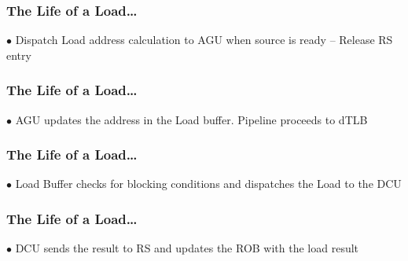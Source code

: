 \documentclass[aspectratio=169,12pt]{beamer}
\begin{document}
\begin{frame}
\frametitle{The Life of a Load\ldots}
\begin{center}
\LoadLifecycleDiagram[
    rat3={RF0},
    robNum={Ld},
    robValid={1},
    robRdy={0},
    robData={X},
    iq1={R3$\leftarrow$MEM(R2+50)},
    lbV={1},
    lbAddr={Not Valid},
    lbBC={0},
    agu={R2+50},
    arrows=2
]
\end{center}
\vspace{-3mm}
\scriptsize
$\bullet$ Dispatch Load address calculation to AGU when source is ready -- Release RS entry
\end{frame}

\begin{frame}
\frametitle{The Life of a Load\ldots}
\begin{center}
\LoadLifecycleDiagram[
    rat3={RF0},
    robNum={Ld},
    robValid={1},
    robRdy={0},
    robData={X},
    iq1={R3$\leftarrow$MEM(R2+50)},
    lbV={1},
    lbAddr={V(R2+50)},
    lbBC={0},
    arrows=3
]
\end{center}
\vspace{-3mm}
\scriptsize
$\bullet$ AGU updates the address in the Load buffer. Pipeline proceeds to dTLB
\end{frame}

\begin{frame}
\frametitle{The Life of a Load\ldots}
\begin{center}
\LoadLifecycleDiagram[
    rat3={RF0},
    robNum={Ld},
    robValid={1},
    robRdy={0},
    robData={X},
    iq1={R3$\leftarrow$MEM(R2+50)},
    lbV={1},
    lbAddr={V(R2+50)},
    lbBC={0},
    arrows=4
]
\end{center}
\vspace{-3mm}
\scriptsize
$\bullet$ Load Buffer checks for blocking conditions and dispatches the Load to the DCU
\end{frame}

\begin{frame}
\frametitle{The Life of a Load\ldots}
\begin{center}
\LoadLifecycleDiagram[
    rat3={RF0},
    robNum={Ld},
    robValid={1},
    robRdy={1},
    robData={data},
    iq1={R3$\leftarrow$MEM(R2+50)},
    lbV={1},
    lbAddr={V(R2+50)},
    lbBC={0},
    arrows=4
]
\end{center}
\vspace{-3mm}
\scriptsize
$\bullet$ DCU sends the result to RS and updates the ROB with the load result
\end{frame}
\end{document}
